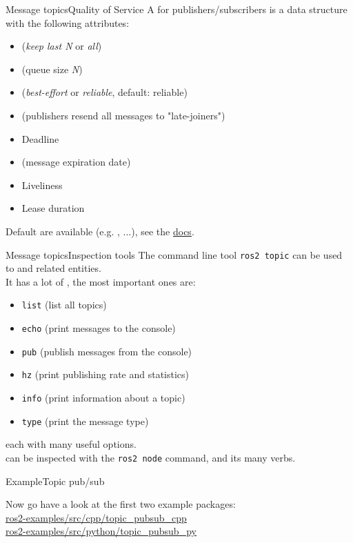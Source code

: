 \begin{frame}{Message topics}{Quality of Service}
	A  for publishers/subscribers is a data structure with the following attributes:
	\begin{itemize}
		\item {} (\emph{keep last N} or \emph{all})
		\item {} (queue size \emph{N})
		\item {} (\emph{best-effort} or \emph{reliable}, default: reliable)
		\item {} (publishers resend all messages to "late-joiners")
		\item Deadline
		\item {} (message expiration date)
		\item Liveliness
		\item Lease duration
	\end{itemize}
	Default  are available (e.g. , ...), see the \href{https://docs.ros.org/en/jazzy/Concepts/About-Quality-of-Service-Settings.html}{\color{blue}\underline{docs}}.
\end{frame}
\begin{frame}{Message topics}{Inspection tools}
  The command line tool \texttt{ros2 topic} can be used to  and related entities.\\
  It has a lot of , the most important ones are:
  \begin{itemize}
    \item \texttt{list} (list all topics)
    \item \texttt{echo} (print messages to the console)
    \item \texttt{pub} (publish messages from the console)
    \item \texttt{hz} (print publishing rate and statistics)
    \item \texttt{info} (print information about a topic)
    \item \texttt{type} (print the message type)
  \end{itemize}
  each with many useful options.\\
   can be inspected with the \texttt{ros2 node} command, and its many verbs.
\end{frame}

\begin{frame}{Example}{Topic pub/sub}
  \begin{block}{}
    \centering
	  Now go have a look at the first two example packages:\\
    \href{https://github.com/IntelligentSystemsLabUTV/ros2-examples/tree/jazzy/src/cpp/topic_pubsub_cpp}{\color{blue}\underline{ros2-examples/src/cpp/topic\_pubsub\_cpp}}\\
    \smallskip
    \href{https://github.com/IntelligentSystemsLabUTV/ros2-examples/tree/jazzy/src/python/topic_pubsub_py}{\color{blue}\underline{ros2-examples/src/python/topic\_pubsub\_py}}
  \end{block}
\end{frame}

